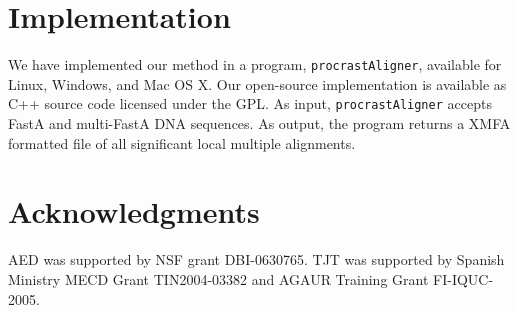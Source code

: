 \documentclass{ws-procs9x6}
\begin{document}
\section{Implementation}
We have implemented our method in a program, \texttt{procrastAligner}, available for Linux, Windows, and Mac OS X. Our open-source implementation is available as C++ source code licensed under the GPL. As input, \texttt{procrastAligner} accepts FastA and multi-FastA DNA sequences. As output, the program returns a XMFA formatted file of all significant local multiple alignments.

\section{ Acknowledgments }
AED was supported by NSF grant DBI-0630765. TJT was
supported by Spanish Ministry MECD Grant TIN2004-03382 and AGAUR
Training Grant FI-IQUC-2005.




\end{document}
